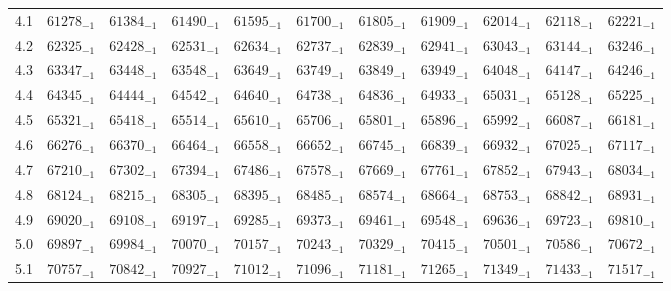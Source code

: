 \documentclass[10pt, a4paper]{article}
\begin{document}
\begin{center}
\begin{longtable}{c || c c c c c | c c c c c}
        4.1 & \({61278}_{-1}\) & \({61384}_{-1}\) & \({61490}_{-1}\) & \({61595}_{-1}\) & \({61700}_{-1}\) & \({61805}_{-1}\) & \({61909}_{-1}\) & \({62014}_{-1}\) & \({62118}_{-1}\) & \({62221}_{-1}\)\\
        4.2 & \({62325}_{-1}\) & \({62428}_{-1}\) & \({62531}_{-1}\) & \({62634}_{-1}\) & \({62737}_{-1}\) & \({62839}_{-1}\) & \({62941}_{-1}\) & \({63043}_{-1}\) & \({63144}_{-1}\) & \({63246}_{-1}\)\\
        4.3 & \({63347}_{-1}\) & \({63448}_{-1}\) & \({63548}_{-1}\) & \({63649}_{-1}\) & \({63749}_{-1}\) & \({63849}_{-1}\) & \({63949}_{-1}\) & \({64048}_{-1}\) & \({64147}_{-1}\) & \({64246}_{-1}\)\\
        4.4 & \({64345}_{-1}\) & \({64444}_{-1}\) & \({64542}_{-1}\) & \({64640}_{-1}\) & \({64738}_{-1}\) & \({64836}_{-1}\) & \({64933}_{-1}\) & \({65031}_{-1}\) & \({65128}_{-1}\) & \({65225}_{-1}\)\\
        4.5 & \({65321}_{-1}\) & \({65418}_{-1}\) & \({65514}_{-1}\) & \({65610}_{-1}\) & \({65706}_{-1}\) & \({65801}_{-1}\) & \({65896}_{-1}\) & \({65992}_{-1}\) & \({66087}_{-1}\) & \({66181}_{-1}\)\\
        4.6 & \({66276}_{-1}\) & \({66370}_{-1}\) & \({66464}_{-1}\) & \({66558}_{-1}\) & \({66652}_{-1}\) & \({66745}_{-1}\) & \({66839}_{-1}\) & \({66932}_{-1}\) & \({67025}_{-1}\) & \({67117}_{-1}\)\\
        4.7 & \({67210}_{-1}\) & \({67302}_{-1}\) & \({67394}_{-1}\) & \({67486}_{-1}\) & \({67578}_{-1}\) & \({67669}_{-1}\) & \({67761}_{-1}\) & \({67852}_{-1}\) & \({67943}_{-1}\) & \({68034}_{-1}\)\\
        4.8 & \({68124}_{-1}\) & \({68215}_{-1}\) & \({68305}_{-1}\) & \({68395}_{-1}\) & \({68485}_{-1}\) & \({68574}_{-1}\) & \({68664}_{-1}\) & \({68753}_{-1}\) & \({68842}_{-1}\) & \({68931}_{-1}\)\\
        4.9 & \({69020}_{-1}\) & \({69108}_{-1}\) & \({69197}_{-1}\) & \({69285}_{-1}\) & \({69373}_{-1}\) & \({69461}_{-1}\) & \({69548}_{-1}\) & \({69636}_{-1}\) & \({69723}_{-1}\) & \({69810}_{-1}\)\\
        \hline
        5.0 & \({69897}_{-1}\) & \({69984}_{-1}\) & \({70070}_{-1}\) & \({70157}_{-1}\) & \({70243}_{-1}\) & \({70329}_{-1}\) & \({70415}_{-1}\) & \({70501}_{-1}\) & \({70586}_{-1}\) & \({70672}_{-1}\)\\
        5.1 & \({70757}_{-1}\) & \({70842}_{-1}\) & \({70927}_{-1}\) & \({71012}_{-1}\) & \({71096}_{-1}\) & \({71181}_{-1}\) & \({71265}_{-1}\) & \({71349}_{-1}\) & \({71433}_{-1}\) & \({71517}_{-1}\)\\

\end{longtable}
\end{center}
\end{document}
